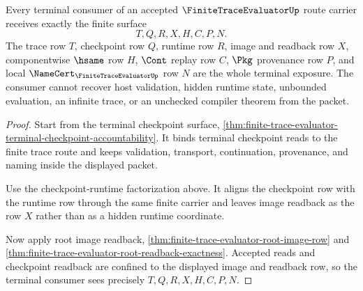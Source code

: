 \begin{theorem}
\label{thm:finite-trace-evaluator-terminal-route-exposure}
Every terminal consumer of an accepted $\FiniteTraceEvaluatorUp$ route carrier
receives exactly the finite surface
$$
T,Q,R,X,H,C,P,N.
$$
The trace row $T$, checkpoint row $Q$, runtime row $R$, image and readback row
$X$, componentwise $\hsame$ row $H$, $\Cont$ replay row $C$, $\Pkg$
provenance row $P$, and local $\NameCert_{\FiniteTraceEvaluatorUp}$ row $N$
are the whole terminal exposure. The consumer cannot recover host validation,
hidden runtime state, unbounded evaluation, an infinite trace, or an unchecked
compiler theorem from the packet.
\end{theorem}
\begin{proof}
Start from the terminal checkpoint surface,
\autoref{thm:finite-trace-evaluator-terminal-checkpoint-accountability}. It
binds terminal checkpoint reads to the finite trace route and keeps validation,
transport, continuation, provenance, and naming inside the displayed packet.

Use the checkpoint-runtime factorization above. It aligns the checkpoint row
with the runtime row through the same finite carrier and leaves image readback
as the row $X$ rather than as a hidden runtime coordinate.

Now apply root image readback,
\autoref{thm:finite-trace-evaluator-root-image-row} and
\autoref{thm:finite-trace-evaluator-root-readback-exactness}. Accepted reads
and checkpoint readback are confined to the displayed image and readback row,
so the terminal consumer sees precisely $T,Q,R,X,H,C,P,N$.
\end{proof}


